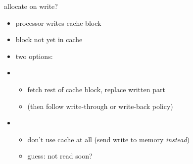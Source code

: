 \begin{frame}{allocate on write?}
\begin{itemize}
\item processor writes  cache block
\item block not yet in cache
\item two options:
\vspace{0.5cm}
\item {}
    \begin{itemize}
    \item fetch rest of cache block, replace written part
    \item (then follow write-through or write-back policy)
    \end{itemize}
\item {}
    \begin{itemize}
    \item don't use cache at all (send write to memory \textit{instead})
    \item guess: not read soon?
    \end{itemize}
\end{itemize}
\end{frame}

